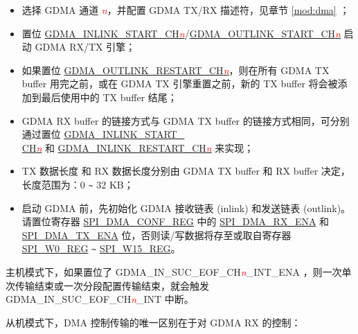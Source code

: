 \documentclass[main\_\_CN.tex]{subfiles}
\begin{document}
\begin{itemize}
    \item 选择 GDMA 通道 \textcolor{red}{\it{n}}，并配置 GDMA TX/RX 描述符，见章节 \ref{mod:dma} \textit{}；

    \item 置位 \hyperref[fielddesc:GDMAINLINKSTARTCHN]{GDMA\_INLINK\_START\_CH\textcolor{red}{\it{n}}}/\hyperref[fielddesc:GDMAOUTLINKSTARTCHN]{GDMA\_OUTLINK\_START\_CH\textcolor{red}{\it{n}}}  启动 GDMA RX/TX 引擎；

    \item 如果置位 \hyperref[fielddesc:GDMAOUTLINKRESTARTCHN]{GDMA\_OUTLINK\_RESTART\_CH\textcolor{red}{\it{n}}}，则在所有 GDMA TX buffer 用完之前，或在 GDMA TX 引擎重置之前，新的 TX buffer 将会被添加到最后使用中的 TX buffer 结尾；

    \item GDMA RX buffer 的链接方式与 GDMA TX buffer 的链接方式相同，可分别通过置位 \hyperref[fielddesc:GDMAINLINKSTARTCHN]{GDMA\_INLINK\_START\_\\CH\textcolor{red}{\it{n}}} 和 \hyperref[fielddesc:GDMAINLINKRESTARTCHN]{GDMA\_INLINK\_RESTART\_CH\textcolor{red}{\it{n}}} 来实现；

    \item TX 数据长度 和 RX 数据长度分别由 GDMA TX buffer 和 RX buffer 决定，长度范围为：0 \verb+~+ 32 KB；

    \item 启动 GDMA 前，先初始化 GDMA 接收链表 (inlink) 和发送链表 (outlink)。请置位寄存器 \hyperref[regdesc:SPIDMACONFREG]{SPI\_DMA\_CONF\_REG} 中的 \hyperref[fielddesc:SPIDMARXENA]{SPI\_DMA\_RX\_ENA} 和 \hyperref[fielddesc:SPIDMATXENA]{SPI\_DMA\_TX\_ENA} 位，否则读/写数据将存至或取自寄存器 \hyperref[regdesc:SPIW0REG]{SPI\_W0\_REG} \verb+~+ \hyperref[regdesc:SPIW15REG]{SPI\_W15\_REG}。

\end{itemize}

主机模式下，如果置位了 GDMA\_IN\_SUC\_EOF\_CH\textcolor{red}{\it{n}}\_INT\_ENA ，则一次单次传输结束或一次分段配置传输结束，就会触发 GDMA\_IN\_SUC\_EOF\_CH\textcolor{red}{\it{n}}\_INT  中断。

从机模式下，DMA 控制传输的唯一区别在于对 GDMA RX 的控制：
\end{document}
